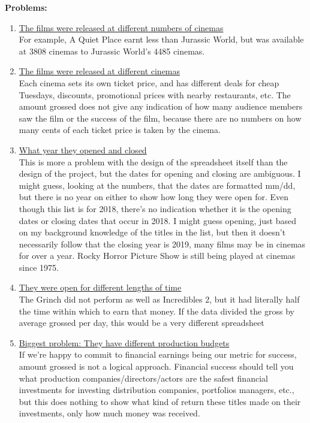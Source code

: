 \documentclass[12pt]{article}
\begin{document}
\vspace{1em}
\newpage
\textbf{Problems:}
\begin{enumerate}
    \item \underline{The films were released at different numbers of cinemas}
    \vspace{0.5em}
    \\For example, A Quiet Place earnt less than Jurassic World, but was available at 3808 cinemas to Jurassic World’s 4485 cinemas.
    \item \underline{The films were released at different cinemas}
    \vspace{0.5em}
    \\Each cinema sets its own ticket price, and has different deals for cheap Tuesdays, discounts, promotional prices with nearby restaurants, etc. The amount grossed does not give any indication of how many audience members saw the film or the success of the film, because there are no numbers on how many cents of each ticket price is taken by the cinema.
    \item \underline{What year they opened and closed}
    \vspace{0.5em}
    \\This is more a problem with the design of the spreadsheet itself than the design of the project, but the dates for opening and closing are ambiguous. I might guess, looking at the numbers, that the dates are formatted mm/dd, but there is no year on either to show how long they were open for. Even though this list is for 2018, there’s no indication whether it is the opening dates or closing dates that occur in 2018. I might guess opening, just based on my background knowledge of the titles in the list, but then it doesn’t necessarily follow that the closing year is 2019, many films may be in cinemas for over a year. Rocky Horror Picture Show is still being played at cinemas since 1975.
    \item \underline{They were open for different lengths of time}
    \vspace{0.5em}
    \\The Grinch did not perform as well as Incredibles 2, but it had literally half the time within which to earn that money. If the data divided the gross by average grossed per day, this would be a very different spreadsheet
    \item \underline{Biggest problem: They have different production budgets}
    \vspace{0.5em}
    \\If we’re happy to commit to financial earnings being our metric for success, amount grossed is not a logical approach. Financial success should tell you what production companies/directors/actors are the safest financial investments for investing distribution companies, portfolios managers, etc., but this does nothing to show what kind of return these titles made on their investments, only how much money was received. 

\end{enumerate}
\end{document}
